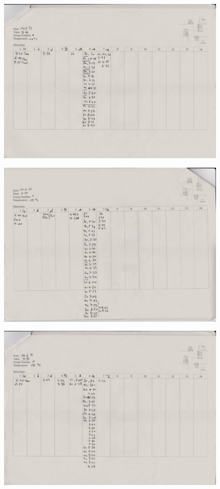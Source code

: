 \begin{figure}[htbp]
  \includegraphics[width=\linewidth]{scans/Bild (13).jpg}
\end{figure}

\begin{figure}[htbp]
  \includegraphics[width=\linewidth]{scans/Bild (14).jpg}
\end{figure}

\begin{figure}[htbp]
  \includegraphics[width=\linewidth]{scans/Bild (15).jpg}
\end{figure}


